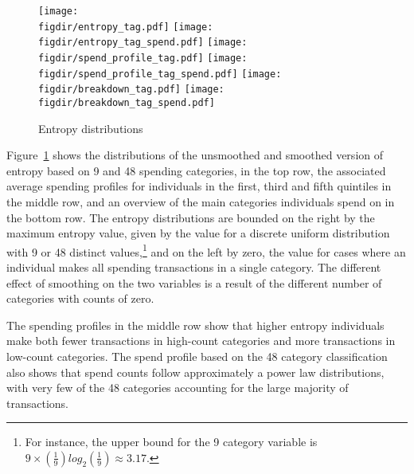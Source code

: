 \begin{figure}[ht] \centering \caption{Entropy distributions}
    \label{fig:entropy}
    \texttt{[image: \\figdir/entropy\_tag.pdf]}
    \texttt{[image: \\figdir/entropy\_tag\_spend.pdf]}
    \texttt{[image: \\figdir/spend\_profile\_tag.pdf]}
    \texttt{[image: \\figdir/spend\_profile\_tag\_spend.pdf]}
    \texttt{[image: \\figdir/breakdown\_tag.pdf]}
    \texttt{[image: \\figdir/breakdown\_tag\_spend.pdf]}
\end{figure}

Figure~\ref{fig:entropy} shows the distributions of the unsmoothed and smoothed
version of entropy based on 9 and 48 spending categories, in the top row, the
associated average spending profiles for individuals in the first, third and
fifth quintiles in the middle row, and an overview of the main categories
individuals spend on in the bottom row. The entropy distributions are bounded
on the right by the maximum entropy value, given by the value for a discrete
uniform distribution with 9 or 48 distinct values,\footnote{For instance, the
upper bound for the 9 category variable is $9 \times
\left(\frac{1}{9}\right)log_2\left(\frac{1}{9}\right) \approx 3.17$.} and on
the left by zero, the value for cases where an individual makes all spending
transactions in a single category. The different effect of smoothing on the two
variables is a result of the different number of categories with counts of
zero.

The spending profiles in the middle row show that higher entropy individuals
make both fewer transactions in high-count categories and more transactions in
low-count categories. The spend profile based on the 48 category classification
also shows that spend counts follow approximately a power law distributions,
with very few of the 48 categories accounting for the large majority of
transactions.

